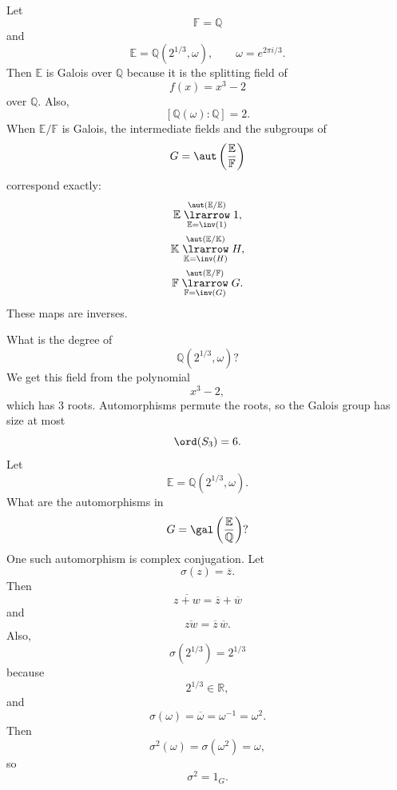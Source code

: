 \begin{example}
    Let
    \[
        \mathbb{F}=\mathbb{Q}
    \]
    and
    \[
        \mathbb{E}=\mathbb{Q}\left(2^{1/3},\omega\right),
        \qquad
        \omega=e^{2\pi i/3}.
    \]
    Then $\mathbb{E}$ is Galois over $\mathbb{Q}$ because it is the splitting field of
    \[
        f(x)=x^3-2
    \]
    over $\mathbb{Q}$.
    Also,
    \[
        [\mathbb{Q}(\omega):\mathbb{Q}]=2.
    \]
    When $\mathbb{E}/\mathbb{F}$ is Galois, the intermediate fields and the subgroups of
    \[
        G=\aut\left(\frac{\mathbb{E}}{\mathbb{F}}\right)
    \]
    correspond exactly:
    \begin{gather*}
        \mathbb{E}
        \stackrel{\aut(\mathbb{E}/\mathbb{E})}{\underset{\mathbb{E}=\inv(1)}{\lrarrow}}
        1,\\
        \mathbb{K}
        \stackrel{\aut(\mathbb{E}/\mathbb{K})}{\underset{\mathbb{K}=\inv(H)}{\lrarrow}}
        H,\\
        \mathbb{F}
        \stackrel{\aut(\mathbb{E}/\mathbb{F})}{\underset{\mathbb{F}=\inv(G)}{\lrarrow}}
        G.\\
    \end{gather*}
    These maps are inverses.
\end{example}

What is the degree of
\[
    \mathbb{Q}\left(2^{1/3},\omega\right)?
\]
We get this field from the polynomial
\[
    x^3-2,
\]
which has $3$ roots.
Automorphisms permute the roots, so the Galois group has size at most
\[
    \ord(S_3)=6.
\]
Let
\[
    \mathbb{E}=\mathbb{Q}\left(2^{1/3},\omega\right).
\]
What are the automorphisms in
\[
    G=\gal\left(\frac{\mathbb{E}}{\mathbb{Q}}\right)?
\]
One such automorphism is complex conjugation.
Let
\[
    \sigma(z)=\overline{z}.
\]
Then
\[
    \overline{z+w}=\overline{z}+\overline{w}
\]
and
\[
    \overline{zw}=\overline{z}\,\overline{w}.
\]
Also,
\[
    \sigma\left(2^{1/3}\right)=2^{1/3}
\]
because
\[
    2^{1/3}\in \mathbb{R},
\]
and
\[
    \sigma(\omega)=\overline{\omega}=\omega^{-1}=\omega^2.
\]
Then
\[
    \sigma^2(\omega)=\sigma(\omega^2)=\omega,
\]
so
\[
    \sigma^2=1_G.
\]
